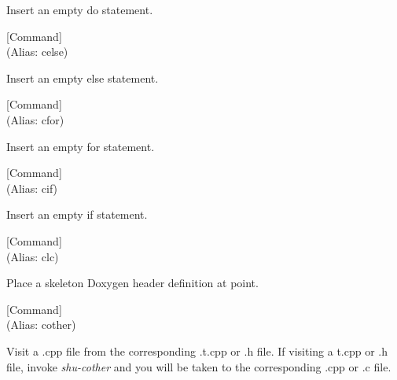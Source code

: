 \begin{doc-string}
Insert an empty do statement.
\end{doc-string}

\vspace{1em}
\noindent
{}
\usebox{\funcname}
 \hfill [Command]\\%
 (Alias: celse)

\begin{doc-string}
Insert an empty else statement.
\end{doc-string}

\vspace{1em}
\noindent
{}
\usebox{\funcname}
 \hfill [Command]\\%
 (Alias: cfor)

\begin{doc-string}
Insert an empty for statement.
\end{doc-string}

\vspace{1em}
\noindent
{}
\usebox{\funcname}
 \hfill [Command]\\%
 (Alias: cif)

\begin{doc-string}
Insert an empty if statement.
\end{doc-string}

\vspace{1em}
\noindent
{}
\usebox{\funcname}
 \hfill [Command]\\%
 (Alias: clc)

\begin{doc-string}
Place a skeleton Doxygen header definition at point.
\end{doc-string}

\vspace{1em}
\noindent
{}
\usebox{\funcname}
 \hfill [Command]\\%
 (Alias: cother)

\begin{doc-string}
Visit a .cpp file from the corresponding .t.cpp or .h file.  If visiting a t.cpp or .h
file, invoke \emph{shu-cother} and you will be taken to the corresponding .cpp or .c file.
\end{doc-string}

